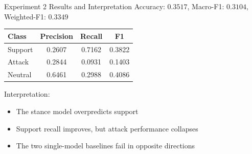 \documentclass[aspectratio=169]{beamer}
\begin{document}
\begin{frame}{Experiment 2 Results and Interpretation}
Accuracy: \(0.3517\), Macro-F1: \(0.3104\), Weighted-F1: \(0.3349\)

\vspace{0.3cm}
\centering
\begin{tabular}{lccc}
\toprule
Class & Precision & Recall & F1 \\
\midrule
Support & 0.2607 & 0.7162 & 0.3822 \\
Attack & 0.2844 & 0.0931 & 0.1403 \\
Neutral & 0.6461 & 0.2988 & 0.4086 \\
\bottomrule
\end{tabular}

\vspace{0.4cm}
Interpretation:
\begin{itemize}
  \item The stance model overpredicts support
  \item Support recall improves, but attack performance collapses
  \item The two single-model baselines fail in opposite directions
\end{itemize}
\end{frame}
\end{document}

